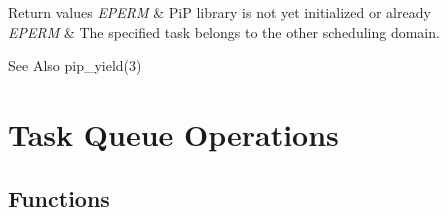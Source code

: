 \documentclass[twoside]{book}
\begin{document}
\begin{DoxyRetVals}{Return values}
{\em E\-P\-E\-R\-M} & Pi\-P library is not yet initialized or already \\
\hline
{\em E\-P\-E\-R\-M} & The specified task belongs to the other scheduling domain.\\
\hline
\end{DoxyRetVals}
\begin{DoxySeeAlso}{See Also}
pip\-\_\-yield(3) 
\end{DoxySeeAlso}
 \hypertarget{group__ulp-1-task-queue}{\section{Task Queue Operations}
\label{group__ulp-1-task-queue}
}
\subsection*{Functions}
\end{document}
